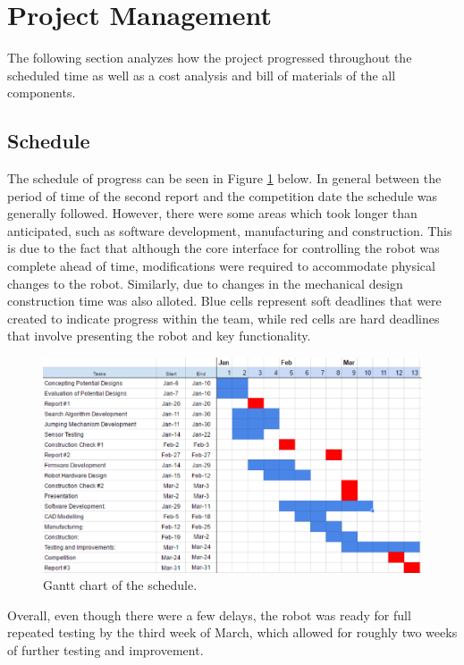 \documentclass[ece]{uw-wkrpt}
\let\oldsection\section
\renewcommand\section{\clearpage\oldsection}
\begin{document}
\section{Project Management}
The following section analyzes how the project progressed throughout the scheduled time as well as a cost analysis and bill of materials of the all components.

\subsection{Schedule}

The schedule of progress can be seen in Figure \ref{fig:gantt} below. In general between the period of time of the second report and the competition date the schedule was generally followed. However, there were some areas which took longer than anticipated, such as software development, manufacturing and construction. This is due to the fact that although the core interface for controlling the robot was complete ahead of time, modifications were required to accommodate physical changes to the robot. Similarly, due to changes in the mechanical design construction time was also alloted. Blue cells represent soft deadlines that were created to indicate progress within the team, while red cells are hard deadlines that involve presenting the robot and key functionality.

\begin{figure}
    \centering
    \includegraphics[width=5.5in]{res/gantChart}
    \caption[Gantt chart of the schedule]
          {Gantt chart of the schedule.}
    \label{fig:gantt}
\end{figure}

Overall, even though there were a few delays, the robot was ready for full repeated testing by the third week of March, which allowed for roughly two weeks of further testing and improvement.
\end{document}
